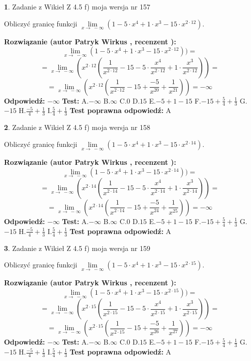 \documentclass[12pt, a4paper]{article}
\theoremstyle{definition} %
\newtheorem{zad}{}
\newcommand{\zadStart}[1]{\begin{zad}#1\newline}
\newcommand{\zadStop}{\end{zad}}
\newcommand{\rozwStart}[2]{\noindent \textbf{Rozwiązanie (autor #1 , recenzent #2): }\newline}
\newcommand{\rozwStop}{\newline}
\newcommand{\odpStart}{\noindent \textbf{Odpowiedź:}\newline}
\newcommand{\odpStop}{\newline}
\newcommand{\testStart}{\noindent \textbf{Test:}\newline}
\newcommand{\testStop}{\newline}
\newcommand{\kluczStart}{\noindent \textbf{Test poprawna odpowiedź:}\newline}
\newcommand{\kluczStop}{\newline}
\begin{document}
\zadStart{Zadanie z Wikieł Z 4.5 f) moja wersja nr 157}



Obliczyć granicę funkcji  $\lim\limits_{x\to\ -\infty}(1 - 5 \cdot x^{4}+1 \cdot x^{3}- 15 \cdot x^{2\cdot12})$.
\zadStop
\rozwStart{Patryk Wirkus}{}
$$\lim\limits_{x\to\ -\infty}(1 - 5 \cdot x^{4}+1 \cdot x^{3}- 15 \cdot x^{2\cdot12}))=$$
$$=\lim\limits_{x\to\ -\infty}(x^{2\cdot12}(\frac{1}{x^{2\cdot12}}-15 -5 \cdot \frac{x^{4}}{x^{2\cdot12}}+1 \cdot \frac{x^{3}}{x^{2\cdot12}}))=$$
$$=\lim\limits_{x\to\ -\infty}(x^{2\cdot12}(\frac{1}{x^{2\cdot12}}-15 + \frac{-5}{x^{20}}+ \frac{1}{x^{21}}))=-\infty$$
\rozwStop
\odpStart
$-\infty$
\odpStop
\testStart
A.$-\infty$ B.$\infty$ C.$0$ D.$15$ E.$-5 + 1 - 15$
F.$-15+\frac{5}{4}+\frac{1}{3}$ G.$-15$
H.$\frac{-5}{4}+\frac{1}{3}$
I.$\frac{5}{4}+\frac{1}{3}$
\testStop
\kluczStart
A
\kluczStop



\zadStart{Zadanie z Wikieł Z 4.5 f) moja wersja nr 158}



Obliczyć granicę funkcji  $\lim\limits_{x\to\ -\infty}(1 - 5 \cdot x^{4}+1 \cdot x^{3}- 15 \cdot x^{2\cdot14})$.
\zadStop
\rozwStart{Patryk Wirkus}{}
$$\lim\limits_{x\to\ -\infty}(1 - 5 \cdot x^{4}+1 \cdot x^{3}- 15 \cdot x^{2\cdot14}))=$$
$$=\lim\limits_{x\to\ -\infty}(x^{2\cdot14}(\frac{1}{x^{2\cdot14}}-15 -5 \cdot \frac{x^{4}}{x^{2\cdot14}}+1 \cdot \frac{x^{3}}{x^{2\cdot14}}))=$$
$$=\lim\limits_{x\to\ -\infty}(x^{2\cdot14}(\frac{1}{x^{2\cdot14}}-15 + \frac{-5}{x^{24}}+ \frac{1}{x^{25}}))=-\infty$$
\rozwStop
\odpStart
$-\infty$
\odpStop
\testStart
A.$-\infty$ B.$\infty$ C.$0$ D.$15$ E.$-5 + 1 - 15$
F.$-15+\frac{5}{4}+\frac{1}{3}$ G.$-15$
H.$\frac{-5}{4}+\frac{1}{3}$
I.$\frac{5}{4}+\frac{1}{3}$
\testStop
\kluczStart
A
\kluczStop



\zadStart{Zadanie z Wikieł Z 4.5 f) moja wersja nr 159}



Obliczyć granicę funkcji  $\lim\limits_{x\to\ -\infty}(1 - 5 \cdot x^{4}+1 \cdot x^{3}- 15 \cdot x^{2\cdot15})$.
\zadStop
\rozwStart{Patryk Wirkus}{}
$$\lim\limits_{x\to\ -\infty}(1 - 5 \cdot x^{4}+1 \cdot x^{3}- 15 \cdot x^{2\cdot15}))=$$
$$=\lim\limits_{x\to\ -\infty}(x^{2\cdot15}(\frac{1}{x^{2\cdot15}}-15 -5 \cdot \frac{x^{4}}{x^{2\cdot15}}+1 \cdot \frac{x^{3}}{x^{2\cdot15}}))=$$
$$=\lim\limits_{x\to\ -\infty}(x^{2\cdot15}(\frac{1}{x^{2\cdot15}}-15 + \frac{-5}{x^{26}}+ \frac{1}{x^{27}}))=-\infty$$
\rozwStop
\odpStart
$-\infty$
\odpStop
\testStart
A.$-\infty$ B.$\infty$ C.$0$ D.$15$ E.$-5 + 1 - 15$
F.$-15+\frac{5}{4}+\frac{1}{3}$ G.$-15$
H.$\frac{-5}{4}+\frac{1}{3}$
I.$\frac{5}{4}+\frac{1}{3}$
\testStop
\kluczStart
A
\kluczStop
\end{document}
